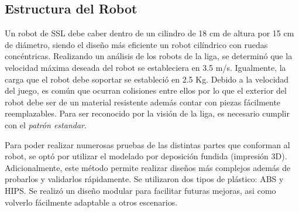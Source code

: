 \documentclass[twocolumn,10pt]{amrob}
\begin{document}
\subsection*{Estructura del Robot}
Un robot de SSL debe caber dentro de un cilindro de 18 cm de altura por 15 cm de diámetro, siendo el diseño más eficiente un robot cilíndrico con ruedas concéntricas.
Realizando un análisis de los robots de la liga, se determinó que la velocidad máxima deseada del robot se estableciera en 3.5 m/s. Igualmente, la carga que el robot debe soportar se estableció en 2.5 Kg. Debido a la velocidad del juego, es común que ocurran colisiones entre ellos por lo que el exterior del robot debe ser de un material resistente además contar con piezas fácilmente reemplazables. Para ser reconocido por la visión de la liga, es necesario cumplir con el \textit{patrón estandar}. \par
Para poder realizar numerosas pruebas de las distintas partes que conforman al robot, se optó por utilizar el modelado por deposición fundida (impresión 3D). Adicionalmente, este método permite realizar diseños más complejos además de probarlos y validarlos rápidamente. Se utilizaron dos tipos de plástico: ABS y HIPS. Se realizó un diseño modular para facilitar futuras mejoras, asi como volverlo fácilmente adaptable a otros escenarios.\par
\end{document}
